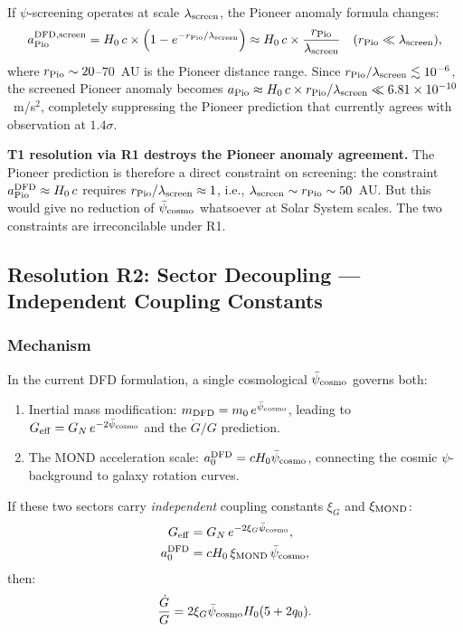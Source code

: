 \documentclass[aps,prd,twocolumn,superscriptaddress,nofootinbib,longbibliography]{revtex4-2}
\newcommand{\psibar}{\bar{\psi}}
\newcommand{\ee}[1]{\times 10^{#1}}
\begin{document}
If $\psi$-screening operates at scale $\lambda_{\rm screen}$, the Pioneer
anomaly formula changes:
\begin{equation}
a_{\rm Pio}^{\rm DFD,screen} = H_0\,c\times
\left(1 - e^{-r_{\rm Pio}/\lambda_{\rm screen}}\right)
\approx H_0\,c\times\frac{r_{\rm Pio}}{\lambda_{\rm screen}}
\quad(r_{\rm Pio} \ll \lambda_{\rm screen}),
\label{eq:pioneer-screened}
\end{equation}
where $r_{\rm Pio} \sim 20$--$70$~AU is the Pioneer distance range.  Since
$r_{\rm Pio}/\lambda_{\rm screen} \lesssim 10^{-6}$, the screened Pioneer
anomaly becomes $a_{\rm Pio} \approx H_0\,c\times r_{\rm Pio}/\lambda_{\rm screen}
\ll 6.81\ee{-10}$~m/s$^2$, completely suppressing the Pioneer prediction that
currently agrees with observation at $1.4\sigma$.

\textbf{T1 resolution via R1 destroys the Pioneer anomaly agreement.}
The Pioneer prediction is therefore a direct constraint on screening: the
constraint $a_{\rm Pio}^{\rm DFD} \approx H_0\,c$ requires
$r_{\rm Pio}/\lambda_{\rm screen} \approx 1$, i.e.,
$\lambda_{\rm screen} \sim r_{\rm Pio} \sim 50$~AU.  But this would give
no reduction of $\psibar_{\rm cosmo}$ whatsoever at Solar System scales.
The two constraints are irreconcilable under R1.

\subsection{Resolution R2: Sector Decoupling --- Independent Coupling Constants}
\label{sec:R2}

\subsubsection{Mechanism}

In the current DFD formulation, a single cosmological $\psibar_{\rm cosmo}$
governs both:
\begin{enumerate}
\item Inertial mass modification: $m_{\rm DFD} = m_0\,e^{\psibar_{\rm cosmo}}$,
  leading to $G_{\rm eff} = G_N\,e^{-2\psibar_{\rm cosmo}}$ and the
  $\dot{G}/G$ prediction.
\item The MOND acceleration scale: $a_0^{\rm DFD} = cH_0\psibar_{\rm cosmo}$,
  connecting the cosmic $\psi$-background to galaxy rotation curves.
\end{enumerate}

If these two sectors carry \emph{independent} coupling constants $\xi_G$ and
$\xi_{\rm MOND}$:
\begin{align}
G_{\rm eff} &= G_N\,e^{-2\xi_G\psibar_{\rm cosmo}},
\label{eq:G-xi}\\
a_0^{\rm DFD} &= cH_0\,\xi_{\rm MOND}\,\psibar_{\rm cosmo},
\label{eq:a0-xi}
\end{align}
then:
\begin{equation}
\frac{\dot{G}}{G} = 2\xi_G\psibar_{\rm cosmo}H_0(5+2q_0).
\label{eq:Gdot-xi}
\end{equation}
\end{document}
